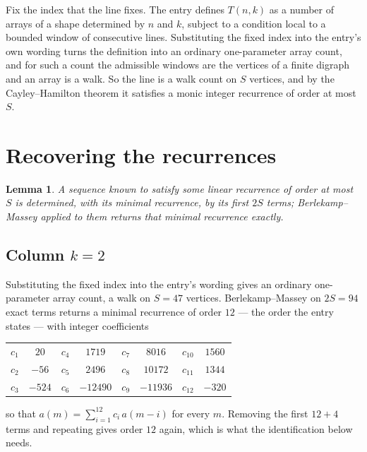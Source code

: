 \documentclass[11pt,a4paper]{article}
\theoremstyle{plain}
\newtheorem{lemma}[theorem]{Lemma}
\theoremstyle{definition}
\begin{document}
Fix the index that the line fixes. The entry defines $T(n,k)$ as a number of arrays of a shape
determined by $n$ and $k$, subject to a condition local to a bounded window of consecutive
lines. Substituting the fixed index into the entry's own wording turns the definition into an
ordinary one-parameter array count, and for such a count the admissible windows are the
vertices of a finite digraph and an array is a walk. So the line is a walk count on $S$
vertices, and by the Cayley--Hamilton theorem it satisfies a monic integer recurrence of order
at most $S$.

\section{Recovering the recurrences}

\begin{lemma}\label{lem:bm}
A sequence known to satisfy some linear recurrence of order at most $S$ is determined, with its
minimal recurrence, by its first $2S$ terms; Berlekamp--Massey applied to them returns that
minimal recurrence exactly.
\end{lemma}

\subsection*{Column $k=2$}
Substituting the fixed index into the entry's wording gives an ordinary one-parameter array
count, a walk on $S=47$ vertices. Berlekamp--Massey on $2S=94$ exact terms
returns a minimal recurrence of order $12$ --- the order the entry states --- with
integer coefficients
\begin{center}\small\begin{tabular}{cccccccc}
$c_{1}$ & $20$ & $c_{4}$ & $1719$ & $c_{7}$ & $8016$ & $c_{10}$ & $1560$ \\
$c_{2}$ & $-56$ & $c_{5}$ & $2496$ & $c_{8}$ & $10172$ & $c_{11}$ & $1344$ \\
$c_{3}$ & $-524$ & $c_{6}$ & $-12490$ & $c_{9}$ & $-11936$ & $c_{12}$ & $-320$ \\
\end{tabular}\end{center}
so that $a(m)=\sum_{i=1}^{12}c_i\,a(m-i)$ for every $m$. Removing the first
$12+4$ terms and repeating gives order $12$ again, which is what the
identification below needs.
\end{document}

